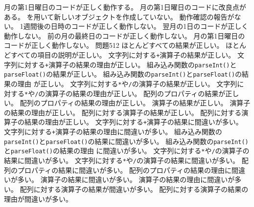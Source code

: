 {{  {月の第1日曜日のコードが正しく動作する。}
  {月の第1日曜日のコードに改良点がある。}
	{を用いて新しいオブジェクトを作成していない。}
  {動作確認の報告がない。}
	}
	{
  {1週間後の日時のコードが正しく動作しない。}
  {翌月の1日のコードが正しく動作しない。}
  {前の月の最終日のコードが正しく動作しない。}
  {月の第1日曜日のコードが正しく動作しない。}
	}
	{問題5}{12}
	{
	{ほとんどすべての結果が正しい。}
	{ほとんどすべての項目の説明が正しい。}
  }
	{
	{文字列に対する\texttt{+}演算子の結果が正しい。}
	{文字列に対する\texttt{+}演算子の結果の理由が正しい。}
	{組み込み関数の\texttt{parseInt()}と\texttt{parseFloat()}の結果が正しい。}
	{組み込み関数の\texttt{parseInt()}と\texttt{parseFloat()}の結果の理由
	が正しい。}
	{文字列に対する\texttt{*}や\texttt{/}の演算子の結果が正しい。}
	{文字列に対する\texttt{*}や\texttt{/}の演算子の結果の理由が正しい。}
	{配列のプロパティの結果が正しい。}
	{配列のプロパティの結果の理由が正しい。}
	{\ElmJ{==}演算子の結果が正しい。}
	{\ElmJ{==}演算子の結果の理由が正しい。}
	{配列に対する\ElmJ{==}演算子の結果が正しい。}
	{配列に対する\ElmJ{==}演算子の結果の理由が正しい。}
	}
	{
	{文字列に対する\texttt{+}演算子の結果に間違いが多い。}
	{文字列に対する\texttt{+}演算子の結果の理由に間違いが多い。}
	{組み込み関数の\texttt{parseInt()}と\texttt{parseFloat()}の結果に間違いが多い。}
	{組み込み関数の\texttt{parseInt()}と\texttt{parseFloat()}の結果の理由
	に間違いが多い。}
	{文字列に対する\texttt{*}や\texttt{/}の演算子の結果に間違いが多い。}
	{文字列に対する\texttt{*}や\texttt{/}の演算子の結果に間違いが多い。}
	{配列のプロパティの結果に間違いが多い。}
	{配列のプロパティの結果の理由に間違いが多い。}
	{\ElmJ{==}演算子の結果に間違いが多い。}
	{\ElmJ{==}演算子の結果の理由に間違いが多い。}
	{配列に対する\ElmJ{==}演算子の結果が間違いが多い。}
	{配列に対する\ElmJ{==}演算子の結果の理由が間違いが多い。}
	}
}
